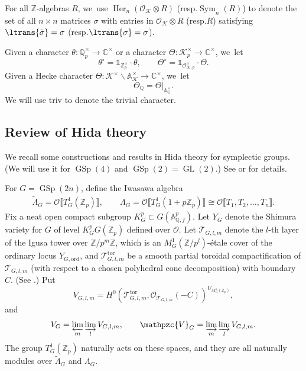 \documentclass[10pt]{amsart}
\newcommand{\resp}{resp.}
\theoremstyle{plain}
\theoremstyle{remark}
\newcommand{\bA}{\mathbb{A}}
\newcommand{\bC}{\mathbb{C}}
\newcommand{\bQ}{\mathbb{Q}}
\newcommand{\bZ}{\mathbb{Z}}
\newcommand{\cK}{\mathcal{K}}
\newcommand{\cO}{\mathcal{O}}
\newcommand{\sT}{\mathscr{T}}
\newcommand{\pzV}{\mathpzc{V}}
\DeclareMathOperator{\GL}{GL}
\DeclareMathOperator{\GSp}{GSp}
\newcommand{\ord}{\mathrm{ord}}
\newcommand{\triv}{\mathrm{triv}}
\newcommand{\tor}{\mathrm{tor}}
\DeclareMathOperator{\Her}{Her}
\DeclareMathOperator{\Sym}{Sym}
\let\wt\widetilde
\let\llb\llbracket
\let\rrb\rrbracket
\begin{document}
For all $\bZ$-algebras $R$, we~use $\Her_n(\cO_\cK\otimes R)$ (\resp $\Sym_n(R)$) to denote the set of all $n\times n$ matrices $\sigma$ with entries in $\cO_\cK\otimes R$ (\resp $R$) satisfying $\ltrans{\bar{\sigma}}=\sigma$ (\resp $\ltrans{\sigma}=\sigma$).

Given a character $\theta:\bQ^\times_p\to \bC^\times$ or a character $\Theta:\cK^\times_p\to\bC^\times$, we~let
\begin{equation}
\label{eq:char-circ}
\theta^\circ=\mathds{1}_{\bZ^\times_p}\cdot \theta,
\qquad
\Theta^\circ=\mathds{1}_{\cO^\times_{\cK,p}}\cdot \Theta.
\end{equation}
Given a Hecke character $\Theta:\cK^\times\backslash\bA^\times_\cK\to\bC^\times$, we~let
\[
\Theta_\bQ=\Theta|_{\bA^\times_\bQ}.
\]
We will use $\triv$ to denote the trivial character.

\subsection{Review of Hida theory}\label{sec:Hida}
We recall some constructions and results in Hida theory for symplectic groups. (We will use it for $\GSp(4)$ and $\GSp(2)=\GL(2)$.) See \cite{HidaCon}or \cite[\S6.1]{SLF} for details.

For $G=\GSp(2n)$, define the Iwasawa algebra
\begin{align}
\label{eq:Iw-alg}
\wt{\Lambda}_G=\cO\llb T^1_G(\bZ_p)\rrb,
\qquad
\Lambda_G=\cO\llb T^1_G(1+p\bZ_p)\rrb\cong\cO\llb T_1,T_2,\dots,T_n\rrb.
\end{align}
Fix a neat open compact subgroup $K^p_G\subset G(\bA^p_{\bQ,f})$. Let $Y_G$ denote the Shimura variety for $G$ of level $K^p_G G(\bZ_p)$ defined over $\cO$. Let $\sT_{G,l,m}$ denote the $l$-th layer of the Igusa tower over $\bZ/p^m\bZ$, which is an $M^1_G(\bZ/p^l)$-\'{e}tale cover of the ordinary locus $Y_{G,\ord}$, and $\sT^\tor_{G,l,m}$ be a smooth partial toroidal compactification of $\sT_{G,l,m}$ (with respect to a chosen polyhedral cone decomposition) with boundary $C$. (See \cite[\S\S2.1,\,3.1,\,3.2]{HidaCon}.) Put
\[
V_{G,l,m}=H^0\left(\sT^\tor_{G,l,m},\cO_{\sT_{G,l,m}}(-C)\right)^{U_{M^1_G(\bZ_p)}},
\]
and
\begin{align*}
V_G=\varprojlim_m\varinjlim_l V_{G,l,m},
\qquad\pzV_G=\varinjlim_m\varinjlim_l V_{G,l,m}.
\end{align*}
The group $T^1_G(\bZ_p)$ naturally acts on these spaces, and they are all naturally modules over $\wt{\Lambda}_G$ and $\Lambda_G$.
\end{document}
